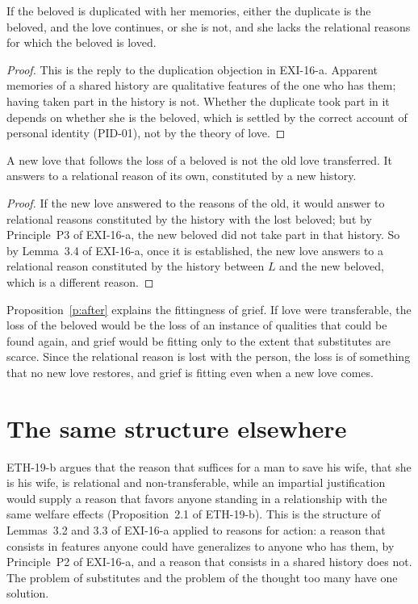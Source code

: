 \documentclass{situationist-preprint}
\begin{document}
\begin{proposition}[Duplication]\label{p:dup}
If the beloved is duplicated with her memories, either the duplicate is the beloved, and the love continues, or she is not, and she lacks the relational reasons for which the beloved is loved.
\end{proposition}

\begin{proof}
This is the reply to the duplication objection in EXI-16-a. Apparent memories of a shared history are qualitative features of the one who has them; having taken part in the history is not. Whether the duplicate took part in it depends on whether she is the beloved, which is settled by the correct account of personal identity (PID-01), not by the theory of love.
\end{proof}

\begin{proposition}\label{p:after}
A new love that follows the loss of a beloved is not the old love transferred. It answers to a relational reason of its own, constituted by a new history.
\end{proposition}

\begin{proof}
If the new love answered to the reasons of the old, it would answer to relational reasons constituted by the history with the lost beloved; but by Principle~P3 of EXI-16-a, the new beloved did not take part in that history. So by Lemma~3.4 of EXI-16-a, once it is established, the new love answers to a relational reason constituted by the history between $L$ and the new beloved, which is a different reason.
\end{proof}

Proposition~\ref{p:after} explains the fittingness of grief. If love were transferable, the loss of the beloved would be the loss of an instance of qualities that could be found again, and grief would be fitting only to the extent that substitutes are scarce. Since the relational reason is lost with the person, the loss is of something that no new love restores, and grief is fitting even when a new love comes.

\section{The same structure elsewhere}

ETH-19-b argues that the reason that suffices for a man to save his wife, that she is his wife, is relational and non-transferable, while an impartial justification would supply a reason that favors anyone standing in a relationship with the same welfare effects (Proposition~2.1 of ETH-19-b). This is the structure of Lemmas~3.2 and 3.3 of EXI-16-a applied to reasons for action: a reason that consists in features anyone could have generalizes to anyone who has them, by Principle~P2 of EXI-16-a, and a reason that consists in a shared history does not. The problem of substitutes and the problem of the thought too many have one solution.
\end{document}
